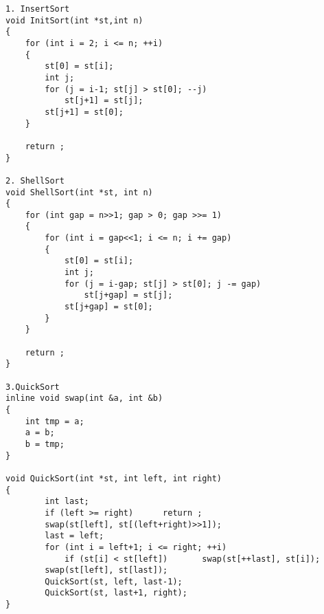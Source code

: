 \documentclass[11pt, a4paper]{article}
\begin{document}
\lstset{numbers=left, escapeinside=``}

\begin{lstlisting}[language={[ANSI]C}]
1. InsertSort 
void InitSort(int *st,int n)
{
	for (int i = 2; i <= n; ++i)
	{
		st[0] = st[i];
		int j;
		for (j = i-1; st[j] > st[0]; --j)
			st[j+1] = st[j];
		st[j+1] = st[0];
	}

	return ;
}

2. ShellSort
void ShellSort(int *st, int n)
{
    for (int gap = n>>1; gap > 0; gap >>= 1)
    {
        for (int i = gap<<1; i <= n; i += gap)
        {
            st[0] = st[i];
            int j;
            for (j = i-gap; st[j] > st[0]; j -= gap)
                st[j+gap] = st[j];
            st[j+gap] = st[0];
        }
    }

    return ;
}

3.QuickSort 
inline void swap(int &a, int &b)
{
    int tmp = a;
    a = b;
    b = tmp;
}

void QuickSort(int *st, int left, int right)
{
        int last;
        if (left >= right)      return ;
        swap(st[left], st[(left+right)>>1]);
        last = left;
        for (int i = left+1; i <= right; ++i)
            if (st[i] < st[left])       swap(st[++last], st[i]);
        swap(st[left], st[last]);
        QuickSort(st, left, last-1);
        QuickSort(st, last+1, right);
}
\end{lstlisting}
\end{document}
